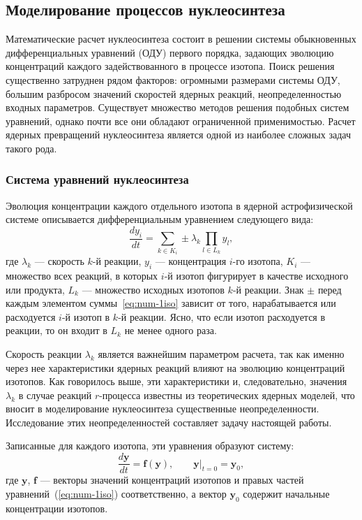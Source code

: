 \subsection{Моделирование процессов нуклеосинтеза}
Математические расчет нуклеосинтеза состоит в решении системы обыкновенных дифференциальных уравнений (ОДУ) первого порядка, задающих эволюцию концентраций каждого задействованного в процессе изотопа. Поиск решения существенно затруднен рядом факторов: огромными размерами системы ОДУ, большим разбросом значений скоростей ядерных реакций, неопределенностью входных параметров. Существует множество методов решения подобных систем уравнений, однако почти все они обладают ограниченной применимостью. Расчет ядерных превращений нуклеосинтеза является одной из наиболее сложных задач такого рода.

\subsubsection{Система уравнений нуклеосинтеза}
Эволюция концентрации каждого отдельного изотопа в ядерной астрофизической системе описывается дифференциальным уравнением следующего вида:
\begin{equation}
\displaystyle \frac{d y_i}{d t} = \sum_{k \in K_i} \pm \lambda_k \prod_{l \in L_k} y_l,
\label{eq:num-1iso}
\end{equation}
где $\lambda_k$ --- скорость $k$-й реакции, $y_i$ --- концентрация $i$-го изотопа,  $K_i$ --- множество всех реакций, в которых $i$-й изотоп фигурирует в качестве исходного или продукта, $L_k$ --- множество исходных изотопов $k$-й реакции. Знак $\pm$ перед каждым элементом суммы~\ref{eq:num-1iso} зависит от того, нарабатывается или расходуется $i$-й изотоп в $k$-й реакции. Ясно, что если изотоп расходуется в реакции, то он входит в $L_k$ не менее одного раза.

Скорость реакции $\lambda_k$ является важнейшим параметром расчета, так как именно через нее характеристики ядерных реакций влияют на эволюцию концентраций изотопов. Как говорилось выше, эти характеристики и, следовательно, значения $\lambda_k$ в случае реакций $r$-процесса известны из теоретических ядерных моделей, что вносит в моделирование нуклеосинтеза существенные неопределенности. Исследование этих неопределенностей составляет задачу настоящей работы.

Записанные для каждого изотопа, эти уравнения образуют систему:
\begin{equation}
\displaystyle
\frac{d \bm{y}}{d t} = \bm{f}(\bm{y}), \qquad \bm{y} \bigg\rvert_{t=0} = \bm{y}_0,
\label{eq:num-system}
\end{equation}
где $\bm{y}$, $\bm{f}$ --- векторы значений концентраций изотопов и правых частей уравнений~(\ref{eq:num-1iso}) соответственно, а вектор $\bm{y}_0$ содержит начальные концентрации изотопов. 

